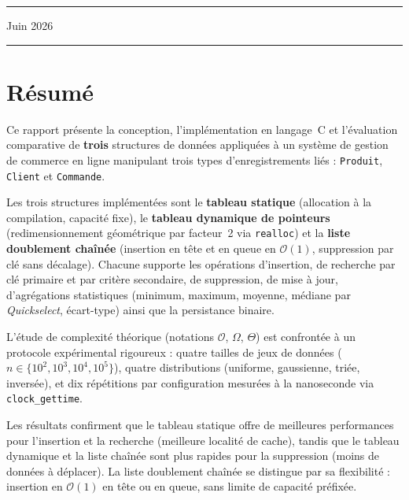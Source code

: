 \documentclass[12pt,a4paper]{report}
\begin{document}
\begin{titlepage}
\vspace{1cm}
{\color{bleufonce}\rule{\linewidth}{0.5pt}}
\vspace{0.3cm}
{\large\color{bleufonce} Juin 2026}

\vfill
{\color{bleufonce}\rule{\linewidth}{2pt}}
\end{titlepage}

\chapter*{Résumé}

Ce rapport présente la conception, l'implémentation en langage~C et l'évaluation comparative de \textbf{trois} structures de données appliquées à un système de gestion de commerce en ligne manipulant trois types d'enregistrements liés : \texttt{Produit}, \texttt{Client} et \texttt{Commande}.

Les trois structures implémentées sont le \textbf{tableau statique} (allocation à la compilation, capacité fixe), le \textbf{tableau dynamique de pointeurs} (redimensionnement géométrique par facteur~2 via \texttt{realloc}) et la \textbf{liste doublement chaînée} (insertion en tête et en queue en $\mathcal{O}(1)$, suppression par clé sans décalage). Chacune supporte les opérations d'insertion, de recherche par clé primaire et par critère secondaire, de suppression, de mise à jour, d'agrégations statistiques (minimum, maximum, moyenne, médiane par \emph{Quickselect}, écart-type) ainsi que la persistance binaire.

L'étude de complexité théorique (notations $\mathcal{O}$, $\Omega$, $\Theta$) est confrontée à un protocole expérimental rigoureux : quatre tailles de jeux de données ($n \in \{10^2, 10^3, 10^4, 10^5\}$), quatre distributions (uniforme, gaussienne, triée, inversée), et dix répétitions par configuration mesurées à la nanoseconde via \texttt{clock\_gettime}.

Les résultats confirment que le tableau statique offre de meilleures performances pour l'insertion et la recherche (meilleure localité de cache), tandis que le tableau dynamique et la liste chaînée sont plus rapides pour la suppression (moins de données à déplacer). La liste doublement chaînée se distingue par sa flexibilité : insertion en $\mathcal{O}(1)$ en tête ou en queue, sans limite de capacité préfixée.
\end{document}
